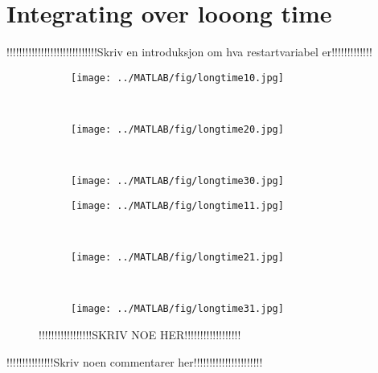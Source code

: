 \chapter{Integrating over looong time}
!!!!!!!!!!!!!!!!!!!!!!!!!!!!!Skriv en introduksjon om hva restartvariabel er!!!!!!!!!!!!!\\
\begin{figure}[H]
        \centering
        \begin{subfigure}[b]{0.3\textwidth}
                \texttt{[image: ../MATLAB/fig/longtime10.jpg]}
                \caption{  }
                \label{fig:longtime10}
        \end{subfigure}
        ~
        \begin{subfigure}[b]{0.3\textwidth}
                \texttt{[image: ../MATLAB/fig/longtime20.jpg]}
                \caption{  }
                \label{fig:longtime20}
        \end{subfigure}
        ~
        \begin{subfigure}[b]{0.3\textwidth}
                \texttt{[image: ../MATLAB/fig/longtime30.jpg]}
                \caption{  }
                \label{fig:longtime30}
        \end{subfigure}
        
        \begin{subfigure}[b]{0.3\textwidth}
                \texttt{[image: ../MATLAB/fig/longtime11.jpg]}
                \caption{  }
                \label{fig:longtime11}
        \end{subfigure}
        ~
        \begin{subfigure}[b]{0.3\textwidth}
                \texttt{[image: ../MATLAB/fig/longtime21.jpg]}
                \caption{  }
                \label{fig:longtime21}
        \end{subfigure}
        ~
        \begin{subfigure}[b]{0.3\textwidth}
                \texttt{[image: ../MATLAB/fig/longtime31.jpg]}
                \caption{  }
                \label{fig:longtime31}
        \end{subfigure}
        \caption{ !!!!!!!!!!!!!!!!!SKRIV NOE HER!!!!!!!!!!!!!!!!!!  }
        \label{fig:longtime}
\end{figure}
!!!!!!!!!!!!!!!Skriv noen commentarer her!!!!!!!!!!!!!!!!!!!!!!\\
